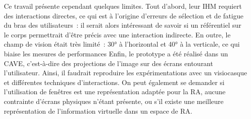 Ce travail présente cependant quelques limites. Tout d'abord, leur IHM requiert des interactions directes, ce qui est à l'origine d'erreurs de sélection et de fatigue du bras des utilisateurs~: il serait alors intéressant de savoir si un référentiel sur le corps permettrait d'être précis avec une interaction indirecte. En outre, le champ de vision était très limité~: 30° à l'horizontal et 40° à la verticale, ce qui biaise les mesures de performances Enfin, le prototype a été réalisé dans un CAVE, c'est-à-dire des projections de l'image sur des écrans entourant l'utilisateur. Ainsi, il faudrait reproduire les expérimentations avec un visiocasque et différentes techniques d'interactions. On peut également se demander si l'utilisation de fenêtres est une représentation adaptée pour la RA, aucune contrainte d'écrans physiques n'étant présente, ou s'il existe une meilleure représentation de l'information virtuelle dans un espace de RA.


